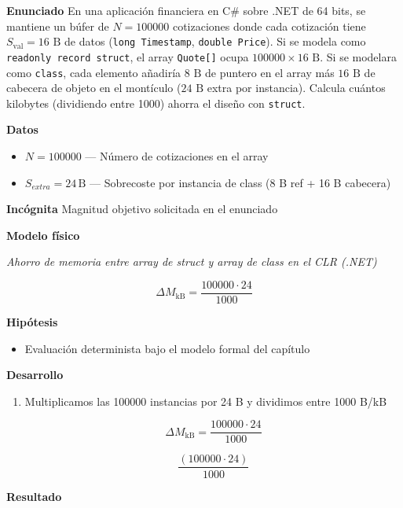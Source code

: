 \documentclass{book}
\begin{document}
\begin{tcolorbox}[title={Problema resuelto}, studiumworked, breakable]

\noindent\textbf{Enunciado}
En una aplicación financiera en C\# sobre .NET de 64 bits, se mantiene un búfer de \(N = 100000\) cotizaciones donde cada cotización tiene \(S_{\text{val}} = 16\text{ B}\) de datos (\texttt{long Timestamp}, \texttt{double Price}). Si se modela como \texttt{readonly record struct}, el array \texttt{Quote[]} ocupa \(100000 \times 16\text{ B}\). Si se modelara como \texttt{class}, cada elemento añadiría \(8\text{ B}\) de puntero en el array más \(16\text{ B}\) de cabecera de objeto en el montículo (\(24\text{ B}\) extra por instancia). Calcula cuántos kilobytes (dividiendo entre 1000) ahorra el diseño con \texttt{struct}.

\noindent\textbf{Datos}
\begin{itemize}
\item $N = 100000$ — Número de cotizaciones en el array
\item $S_{extra} = 24\,\mathrm{B}$ — Sobrecoste por instancia de class (8 B ref + 16 B cabecera)
\end{itemize}

\noindent\textbf{Incógnita}
Magnitud objetivo solicitada en el enunciado

\noindent\textbf{Modelo físico}

\noindent\textit{Ahorro de memoria entre array de struct y array de class en el CLR (.NET)}

\[
\Delta M_{\text{kB}} = \frac{100000 \cdot 24}{1000}
\]

\noindent\textbf{Hipótesis}
\begin{itemize}
\item Evaluación determinista bajo el modelo formal del capítulo
\end{itemize}

\noindent\textbf{Desarrollo}
\begin{enumerate}
\item
Multiplicamos las 100000 instancias por 24 B y dividimos entre 1000 B/kB

\[
\Delta M_{\text{kB}} = \frac{100000 \cdot 24}{1000}
\]

\[
\frac{\left(100000\cdot 24\right)}{1000}
\]
\end{enumerate}

\noindent\textbf{Resultado}


\end{tcolorbox}
\end{document}
